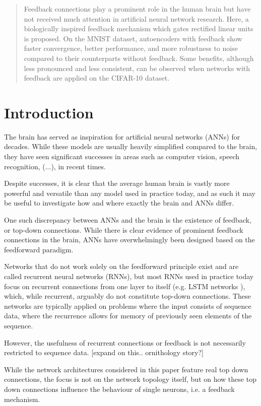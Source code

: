 \documentclass{article}
\begin{document}
\begin{abstract} 
Feedback connections play a prominent role in the human brain but have not received much attention in artificial neural network research. Here, a biologically inspired feedback mechanism which gates rectified linear units is proposed. On the MNIST dataset, autoencoders with feedback show faster convergence, better performance, and more robustness to noise compared to their counterparts without feedback. Some benefits, although less pronounced and less consistent, can be observed when networks with feedback are applied on the CIFAR-10 dataset.\end{abstract} 

\section{Introduction}
\label{introduction}
The brain has served as inspiration for artificial neural networks (ANNs) for decades. While these models are usually heavily simplified compared to the brain, they have seen significant successes in areas such as computer vision, speech recognition, (...), in recent times. 

Despite successes, it is clear that the average human brain is vastly more powerful and versatile than any model used in practice today, and as such it may be useful to investigate how and where exactly the brain and ANNs differ. 

One such discrepancy between ANNs and the brain is the existence of feedback, or top-down connections. While there is clear evidence of prominent feedback connections in the brain, ANNs have overwhelmingly been designed based on the feedforward paradigm. 

Networks that do not work solely on the feedforward principle exist and are called recurrent neural networks (RNNs), but most RNNs used in practice today focus on recurrent connections from one layer to itself (e.g. LSTM networks \cite{hochreiter1997long}), which, while recurrent, arguably do not constitute top-down connections. These networks are typically applied on problems where the input consists of sequence data, where the recurrence allows for memory of previously seen elements of the sequence. 

However, the usefulness of recurrent connections or feedback is not necessarily restricted to sequence data. [expand on this.. ornithology story?]

While the network architectures considered in this paper feature real top down connections, the focus is not on the network topology itself, but on how these top down connections influence the behaviour of single neurons, i.e. a feedback mechanism.
\end{document}
